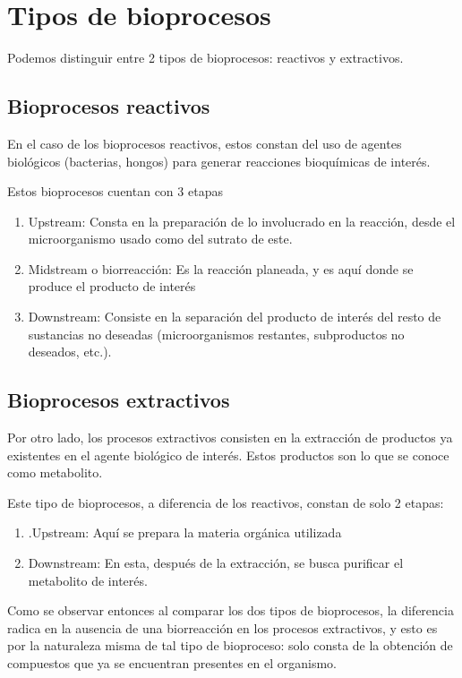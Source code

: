 
\section{Tipos de bioprocesos}

Podemos distinguir entre 2 tipos de bioprocesos: reactivos y extractivos.

\subsection{Bioprocesos reactivos}

En el caso de los bioprocesos reactivos, estos constan del uso de agentes biológicos (bacterias, hongos) para generar reacciones bioquímicas de interés.

Estos bioprocesos cuentan con 3 etapas

\begin{enumerate}
    \item Upstream: Consta en la preparación de lo involucrado en la reacción, desde el microorganismo usado como del sutrato de este.
    \item Midstream o biorreacción: Es la reacción planeada, y es aquí donde se produce el producto de interés
    \item Downstream: Consiste en la separación del producto de interés del resto de sustancias no deseadas (microorganismos restantes, subproductos no deseados, etc.).
\end{enumerate}

\subsection{Bioprocesos extractivos}

Por otro lado, los procesos extractivos consisten en la extracción de productos ya existentes en el agente biológico de interés. Estos productos son lo que se conoce como metabolito.

Este tipo de bioprocesos, a diferencia de los reactivos, constan de solo 2 etapas:

\begin{enumerate}
    \item .Upstream: Aquí se prepara la materia orgánica utilizada
    \item Downstream: En esta, después de la extracción, se busca purificar el metabolito de interés.
\end{enumerate}

Como se observar entonces al comparar los dos tipos de bioprocesos, la diferencia radica en la ausencia de una biorreacción en los procesos extractivos, y esto es por la naturaleza misma de tal tipo de bioproceso: solo consta de la obtención de compuestos que ya se encuentran presentes en el organismo.